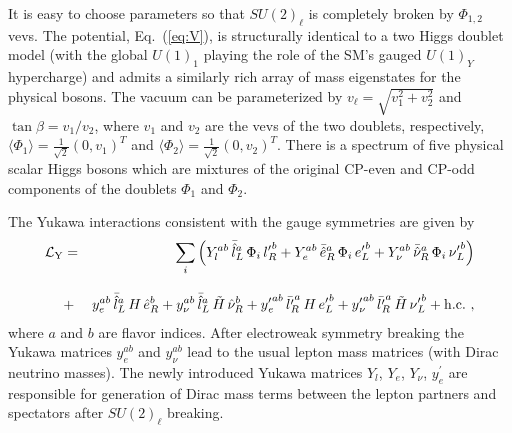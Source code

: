 \documentclass[prd,showpcs,amsmath,amssymb,nofootinbib,preprintnumbers,balancelastpage,longbibliography,superscriptaddress,notitlepage]{revtex4}
\def\bea{\begin{eqnarray}}
\def\eea{\end{eqnarray}}
\def\bea{\begin{eqnarray}}
\def\eea{\end{eqnarray}}
\begin{document}
It is easy to choose parameters so that $SU(2)_\ell$ is completely broken by $\Phi_{1,2}$ vevs.  The potential, Eq.~(\ref{eq:V}), is structurally identical to a two Higgs
doublet model (with the global $U(1)_1$ playing the role of the SM's gauged $U(1)_Y$ hypercharge) 
and admits a similarly rich array of mass eigenstates for the physical bosons.  The vacuum
can be parameterized by $v_\ell = \sqrt{v_1^2 + v_2^2}$ and $\tan \beta = v_1 / v_2$, where $v_1$ and $v_2$ are
the vevs of the two doublets, respectively, $\langle \Phi_1 \rangle = \frac{1}{\sqrt{2}}(0, v_1)^T$ and $\langle \Phi_2 \rangle = \frac{1}{\sqrt{2}}(0, v_2)^T$.  There
is a spectrum of five physical scalar Higgs bosons which are mixtures of the original CP-even and CP-odd components of the doublets $\Phi_1$ and $\Phi_2$.

The Yukawa interactions consistent with the gauge symmetries are given by
\bea
 \mathcal{L}_{\rm Y} &=&   \sum_i \left(Y_l^{ab}\,\bar{\hat{l}}_L^a \, \Phi_i\,  {l'}_{\!\!R}^{b}+ Y_e^{ab} \, \bar{\hat{e}}_R^a \, \Phi_i\, {e'}_{\!\!L}^{b}
   + Y_\nu^{ab}\,\bar{\hat{\nu}}_R^a \, \Phi_i\, {\nu'}_{\!\!L}^{b}\right)\nonumber\\  \nonumber\\[-7pt]
 &+&   y_e^{ab}\, \bar{\hat{l}}_L^a \,H \,\hat{e}_R^b + y_\nu^{ab}\, \bar{\hat{l}}_L^a\, \tilde{H} \,\hat{\nu}_R^b + {y'}_{\!\!e}^{ab}\, \bar{l'}_{\!\!R}^a \,H \,{e'}_{\!\!L}^b + {{y'}}_{\!\!\nu}^{ab}\, \bar{l'}_{\!\!R}^a\,\tilde{H} \, {\nu'}_{\!\!L}^b + {\rm h.c.} \ ,
  \label{lagr}
\eea
where $a$ and $b$ are flavor indices.
After electroweak symmetry breaking the Yukawa matrices $y^{ab}_e$ and $y^{ab}_\nu$ lead to the usual lepton mass matrices (with Dirac neutrino masses). 
The newly introduced Yukawa matrices $Y_l$, $Y_e$, $Y_\nu$, $y^\prime_e$ are responsible for generation of Dirac mass terms between the lepton partners and spectators after $SU(2)_\ell$ breaking.
\end{document}
